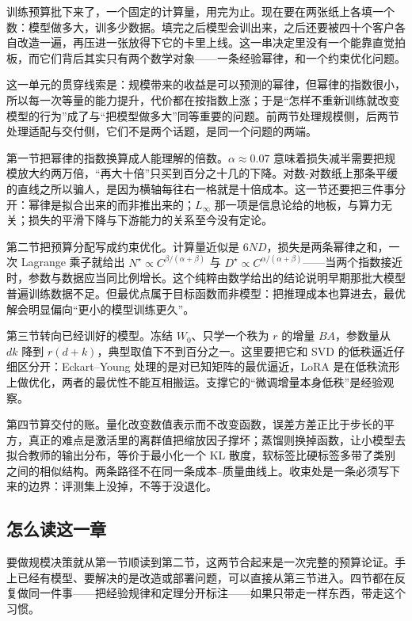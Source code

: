 训练预算批下来了，一个固定的计算量，用完为止。现在要在两张纸上各填一个数：模型做多大，训多少数据。填完之后模型会训出来，之后还要被四十个客户各自改造一遍，再压进一张放得下它的卡里上线。这一串决定里没有一个能靠直觉拍板，而它们背后其实只有两个数学对象——一条经验幂律，和一个约束优化问题。

这一单元的贯穿线索是：规模带来的收益是可以预测的幂律，但幂律的指数很小，所以每一次等量的能力提升，代价都在按指数上涨；于是``怎样不重新训练就改变模型的行为''成了与``把模型做多大''同等重要的问题。前两节处理规模侧，后两节处理适配与交付侧，它们不是两个话题，是同一个问题的两端。

第一节把幂律的指数换算成人能理解的倍数。\(\alpha \approx 0.07\) 意味着损失减半需要把规模放大约两万倍，``再大十倍''只买到百分之十几的下降。对数-对数纸上那条平缓的直线之所以骗人，是因为横轴每往右一格就是十倍成本。这一节还要把三件事分开：幂律是拟合出来的而非推出来的；\(L_\infty\) 那一项是信息论给的地板，与算力无关；损失的平滑下降与下游能力的关系至今没有定论。

第二节把预算分配写成约束优化。计算量近似是 \(6ND\)，损失是两条幂律之和，一次 Lagrange 乘子就给出 \(N^\star \propto C^{\beta/(\alpha+\beta)}\) 与 \(D^\star \propto C^{\alpha/(\alpha+\beta)}\)——当两个指数接近时，参数与数据应当同比例增长。这个纯粹由数学给出的结论说明早期那批大模型普遍训练数据不足。但最优点属于目标函数而非模型：把推理成本也算进去，最优解会明显偏向``更小的模型训练更久''。

第三节转向已经训好的模型。冻结 \(W_0\)、只学一个秩为 \(r\) 的增量 \(BA\)，参数量从 \(dk\) 降到 \(r(d+k)\)，典型取值下不到百分之一。这里要把它和 SVD 的低秩逼近仔细区分开：Eckart--Young 处理的是对已知矩阵的最优逼近，LoRA 是在低秩流形上做优化，两者的最优性不能互相搬运。支撑它的``微调增量本身低秩''是经验观察。

第四节算交付的账。量化改变数值表示而不改变函数，误差方差正比于步长的平方，真正的难点是激活里的离群值把缩放因子撑坏；蒸馏则换掉函数，让小模型去拟合教师的输出分布，等价于最小化一个 KL 散度，软标签比硬标签多带了类别之间的相似结构。两条路径不在同一条成本--质量曲线上。收束处是一条必须写下来的边界：评测集上没掉，不等于没退化。

\subsection{怎么读这一章}

要做规模决策就从第一节顺读到第二节，这两节合起来是一次完整的预算论证。手上已经有模型、要解决的是改造或部署问题，可以直接从第三节进入。四节都在反复做同一件事——把经验规律和定理分开标注——如果只带走一样东西，带走这个习惯。

